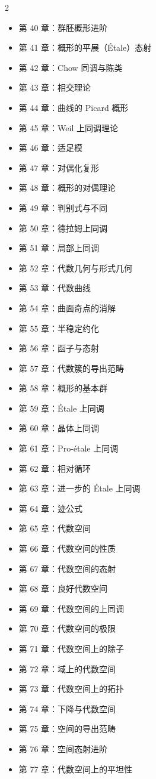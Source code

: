 \begin{multicols}{2}
\begin{itemize}
\item 第 40 章：群胚概形进阶
\item 第 41 章：概形的平展（\'Etale）态射
\item 第 42 章：Chow 同调与陈类
\item 第 43 章：相交理论
\item 第 44 章：曲线的 Picard 概形
\item 第 45 章：Weil 上同调理论
\item 第 46 章：适足模
\item 第 47 章：对偶化复形
\item 第 48 章：概形的对偶理论
\item 第 49 章：判别式与不同
\item 第 50 章：德拉姆上同调
\item 第 51 章：局部上同调
\item 第 52 章：代数几何与形式几何
\item 第 53 章：代数曲线
\item 第 54 章：曲面奇点的消解
\item 第 55 章：半稳定约化
\item 第 56 章：函子与态射
\item 第 57 章：代数簇的导出范畴
\item 第 58 章：概形的基本群
\item 第 59 章：\'Etale 上同调
\item 第 60 章：晶体上同调
\item 第 61 章：Pro-\'etale 上同调
\item 第 62 章：相对循环
\item 第 63 章：进一步的 \'Etale 上同调
\item 第 64 章：迹公式
\item 第 65 章：代数空间
\item 第 66 章：代数空间的性质
\item 第 67 章：代数空间的态射
\item 第 68 章：良好代数空间
\item 第 69 章：代数空间的上同调
\item 第 70 章：代数空间的极限
\item 第 71 章：代数空间上的除子
\item 第 72 章：域上的代数空间
\item 第 73 章：代数空间上的拓扑
\item 第 74 章：下降与代数空间
\item 第 75 章：空间的导出范畴
\item 第 76 章：空间态射进阶
\item 第 77 章：代数空间上的平坦性

\end{itemize}
\end{multicols}
